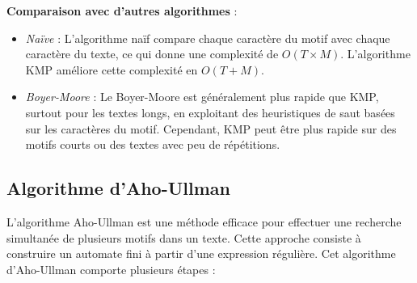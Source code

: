 \documentclass{article}
\begin{document}
    \textbf{Comparaison avec d’autres algorithmes} :
    \begin{itemize}
        \item \textit{Naïve} : L’algorithme naïf compare chaque caractère du motif avec chaque caractère du texte, ce qui donne une complexité de $O(T \times M)$. L’algorithme KMP améliore cette complexité en $O(T + M)$.
        \item \textit{Boyer-Moore} : Le Boyer-Moore \cite{lecroq1992variation} est généralement plus rapide que KMP, surtout pour les textes longs, en exploitant des heuristiques de saut basées sur les caractères du motif. Cependant, KMP peut être plus rapide sur des motifs courts ou des textes avec peu de répétitions.
    \end{itemize}   
    
    \subsection{Algorithme d’Aho-Ullman}
    L’algorithme Aho-Ullman est une méthode efficace pour effectuer une recherche simultanée de plusieurs motifs dans un texte. Cette approche consiste à construire un automate fini à partir d’une expression régulière. Cet algorithme d’Aho-Ullman \cite[Chapter~10]{aho1992foundations} comporte  plusieurs étapes :
\end{document}
